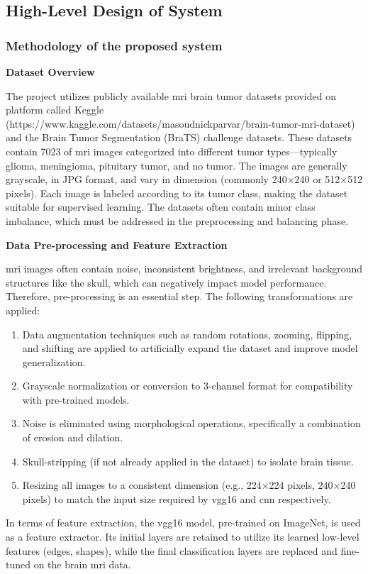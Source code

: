 \subsection{High-Level Design of System}
\subsubsection{Methodology of the proposed system}
\textbf{Dataset Overview}

The project utilizes publicly available \gls{mri} brain tumor datasets provided on platform called Keggle (https://www.kaggle.com/datasets/masoudnickparvar/brain-tumor-\gls{mri}-dataset) and the Brain Tumor Segmentation (BraTS) challenge datasets. These datasets contain 7023 of \gls{mri} images categorized into different tumor types—typically glioma, meningioma, pituitary tumor, and no tumor. The images are generally grayscale, in JPG format, and vary in dimension (commonly 240×240 or 512×512 pixels). Each image is labeled according to its tumor class, making the dataset suitable for supervised learning. The datasets often contain minor class imbalance, which must be addressed in the preprocessing and balancing phase.

\textbf{Data Pre-processing and Feature Extraction}

\gls{mri} images often contain noise, inconsistent brightness, and irrelevant background structures like the skull, which can negatively impact model performance. Therefore, pre-processing is an essential step. The following transformations are applied:
    \begin{enumerate}[label=\roman*.]
    \item Data augmentation techniques such as random rotations, zooming, flipping, and shifting are applied to artificially expand the dataset and improve model generalization.
    \item Grayscale normalization or conversion to 3-channel format for compatibility with pre-trained models.
    \item Noise is eliminated using morphological operations, specifically a combination of erosion and dilation.
    \item Skull-stripping (if not already applied in the dataset) to isolate brain tissue.
    \item Resizing all images to a consistent dimension (e.g., 224×224 pixels, 240×240 pixels) to match the input size required by \gls{vgg16} and \gls{cnn} respectively.
\end{enumerate}
In terms of feature extraction, the \gls{vgg16} model, pre-trained on ImageNet, is used as a feature extractor. Its initial layers are retained to utilize its learned low-level features (edges, shapes), while the final classification layers are replaced and fine-tuned on the brain \gls{mri} data.

